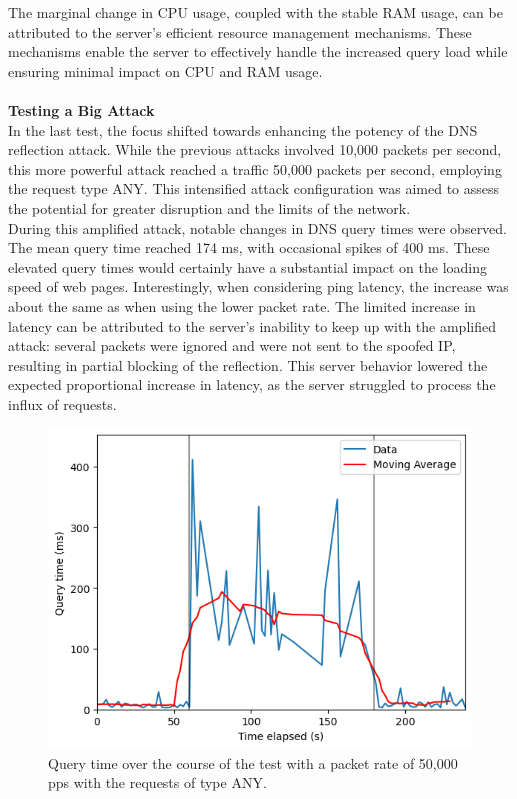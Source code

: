 \noindent The marginal change in CPU usage, coupled with the stable RAM usage, can be attributed to the server's efficient resource management mechanisms. These mechanisms enable the server to effectively handle the increased query load while ensuring minimal impact on CPU and RAM usage.\\
\\
\noindent \textbf{Testing a Big Attack}\\
\noindent In the last test, the focus shifted towards enhancing the potency of the DNS reflection attack. While the previous attacks involved 10,000 packets per second, this more powerful attack reached a traffic 50,000 packets per second, employing the request type ANY. This intensified attack configuration was aimed to assess the potential for greater disruption and the limits of the network.\\
During this amplified attack, notable changes in DNS query times were observed. The mean query time reached 174 ms, with occasional spikes of 400 ms. These elevated query times would certainly have a substantial impact on the loading speed of web pages. Interestingly, when considering ping latency, the increase was about the same as when using the lower packet rate. The limited increase in latency can be attributed to the server's inability to keep up with the amplified attack: several packets were ignored and were not sent to the spoofed IP, resulting in partial blocking of the reflection. This server behavior lowered the expected proportional increase in latency, as the server struggled to process the influx of requests.\\
\begin{figure}[H]
    \centering
    \includegraphics[width=\columnwidth]{Sections/Images/Query_MA_ANY50.png}
    \caption{Query time over the course of the test with a packet rate of 50,000 pps with the requests of type ANY.}
    \label{fig:Query_MA_ANY50}
\end{figure}
